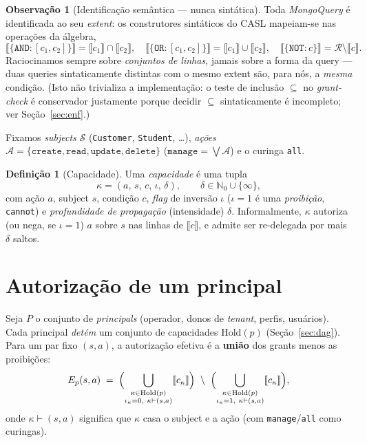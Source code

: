 \documentclass[11pt,a4paper]{article}
\theoremstyle{definition}
\newtheorem{definition}[theorem]{Definição}
\newtheorem{remark}[theorem]{Observação}
\newcommand{\R}{\mathcal{R}}
\newcommand{\ext}[1]{\llbracket #1 \rrbracket}
\newcommand{\Subj}{\mathcal{S}}
\newcommand{\Act}{\mathcal{A}}
\newcommand{\dep}{\delta}
\newcommand{\NN}{\mathbb{N}_0}
\begin{document}
  \begin{remark}[Identificação semântica --- nunca sintática]\label{rem:extent}
  Toda \emph{MongoQuery} é identificada ao seu \emph{extent}: os construtores
  sintáticos do CASL mapeiam-se nas operações da álgebra,
  \[
    \ext{\{\texttt{AND}{:}[c_1,c_2]\}}=\ext{c_1}\cap\ext{c_2},\quad
    \ext{\{\texttt{OR}{:}[c_1,c_2]\}}=\ext{c_1}\cup\ext{c_2},\quad
    \ext{\{\texttt{NOT}{:}c\}}=\R\setminus\ext{c}.
  \]
  Raciocinamos sempre sobre \emph{conjuntos de linhas}, jamais sobre a forma
  da query --- duas queries sintaticamente distintas com o mesmo extent são,
  para nós, a \emph{mesma} condição. (Isto não trivializa a implementação: o
  teste de inclusão $\subseteq$ no \emph{grant-check} é conservador justamente
  porque decidir $\subseteq$ sintaticamente é incompleto; ver
  Seção~\ref{sec:enf}.)
  \end{remark}

  Fixamos \emph{subjects} $\Subj$ (\texttt{Customer}, \texttt{Student}, \dots),
  \emph{ações} $\Act=\{\texttt{create},\texttt{read},\texttt{update},
  \texttt{delete}\}$ ($\texttt{manage}=\bigvee\Act$) e o curinga \texttt{all}.

  \begin{definition}[Capacidade]\label{def:cap}
  Uma \emph{capacidade} é uma tupla
  \[
    \kappa=(a,\,s,\,c,\,\iota,\,\dep), \qquad
    \dep\in\NN\cup\{\infty\},
  \]
  com ação $a$, subject $s$, condição $c$, \emph{flag} de inversão $\iota$
  ($\iota{=}1$ é uma \emph{proibição}, \texttt{cannot}) e \emph{profundidade de
  propagação} (intensidade) $\dep$. Informalmente, $\kappa$ autoriza (ou nega,
  se $\iota{=}1$) $a$ sobre $s$ nas linhas de $\ext{c}$, e admite ser
  re-delegada por mais $\dep$ saltos.
  \end{definition}

  \section{Autorização de um principal}

  Seja $P$ o conjunto de \emph{principals} (operador, donos de \emph{tenant},
  perfis, usuários). Cada principal \emph{detém} um conjunto de capacidades
  $\mathrm{Hold}(p)$ (Seção~\ref{sec:dag}). Para um par fixo $(s,a)$, a
  autorização efetiva é a \textbf{união} dos grants menos as proibições:
  \[
    E_p(s,a)\;=\;
    \Bigl(\bigcup_{\substack{\kappa\in\mathrm{Hold}(p)\\ \iota_\kappa=0,\ \kappa\vdash(s,a)}}\ext{c_\kappa}\Bigr)
    \ \setminus\
    \Bigl(\bigcup_{\substack{\kappa\in\mathrm{Hold}(p)\\ \iota_\kappa=1,\ \kappa\vdash(s,a)}}\ext{c_\kappa}\Bigr),
  \]
  onde $\kappa\vdash(s,a)$ significa que $\kappa$ casa o subject e a ação
  (com \texttt{manage}/\texttt{all} como curingas).
\end{document}
